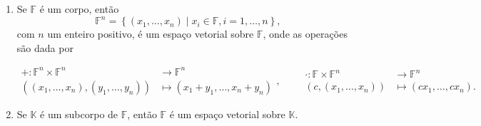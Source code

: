 \begin{example}\leavevmode
	\begin{enumerate}
		\item
		      Se $\mathbb{F}$ é um corpo, então
		      \[
			      \mathbb{F}^{n}=
			      \left\{
			      \left(x_{1},\dotsc,x_{n}\right)
			      \mid x_{i}\in\mathbb{F},
			      i=1,\dotsc,n
			      \right\},
		      \]
		      com $n$ um enteiro positivo, é um espaço vetorial sobre
		      $\mathbb{F}$, onde as operações são dada por

		      \[
			      \begin{aligned}
				      +\colon
				      \mathbb{F}^{n}\times
				      \mathbb{F}^{n} & \longrightarrow
				      \mathbb{F}^{n}                   \\
				      \left(
				      \left(x_{1},\dotsc,x_{n}\right),
				      \left(y_{1},\dotsc,y_{n}\right)
				      \right)        & \longmapsto
				      \left(x_{1}+y_{1},\dotsc,x_{n}+y_{n}\right)
			      \end{aligned},\qquad
			      \begin{aligned}
				      \cdot\colon
				      \mathbb{F}\times
				      \mathbb{F}^{n}                                 & \longrightarrow
				      \mathbb{F}^{n}                                                   \\
				      \left(c,\left(x_{1},\dotsc,x_{n}\right)\right) & \longmapsto
				      \left(cx_{1},\dotsc,cx_{n}\right).
			      \end{aligned}
		      \]

		\item

		      Se $\mathbb{K}$ é um subcorpo de $\mathbb{F}$, então $\mathbb{F}$ é um espaço vetorial sobre $\mathbb{K}$.


\end{enumerate}
\end{example}
